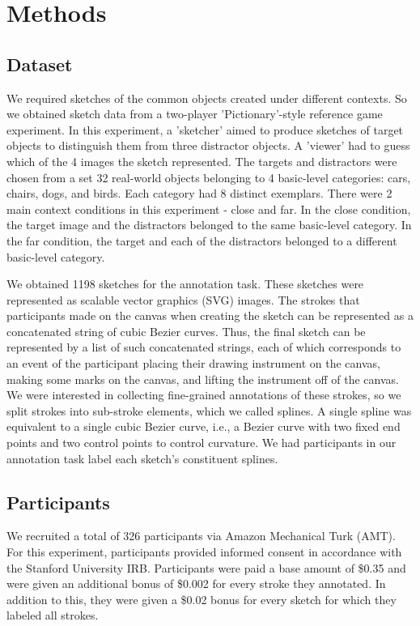 \documentclass[10pt,letterpaper]{article}
\begin{document}
\section{Methods}

\subsection{Dataset}

We required sketches of the common objects created under different contexts. 
So we obtained sketch data from a two-player 'Pictionary'-style reference game experiment. 
In this experiment, a 'sketcher' aimed to produce sketches of target objects to distinguish them from three distractor objects. 
A 'viewer' had to guess which of the 4 images the sketch represented. 
The targets and distractors were chosen from a set 32 real-world objects belonging to 4 basic-level categories: cars, chairs, dogs, and birds. 
Each category had 8 distinct exemplars. 
There were 2 main context conditions in this experiment - close and far. 
In the close condition, the target image and the distractors belonged to the same basic-level category. 
In the far condition, the target and each of the distractors belonged to a different basic-level category.

We obtained 1198 sketches for the annotation task. 
These sketches were represented as scalable vector graphics (SVG) images. 
The strokes that participants made on the canvas when creating the sketch can be represented as a concatenated string of cubic Bezier curves.  
Thus, the final sketch can be represented by a list of such concatenated strings, each of which corresponds to an event of the participant placing their drawing instrument on the canvas, making some marks on the canvas, and lifting the instrument off of the canvas. 
We were interested in collecting fine-grained annotations of these strokes, so we split strokes into sub-stroke elements, which we called splines. 
A single spline was equivalent to a single cubic Bezier curve, i.e., a Bezier curve with two fixed end points and two control points to control curvature. 
We had participants in our annotation task label each sketch's constituent splines.


\subsection{Participants}

We recruited a total of 326 participants via Amazon Mechanical Turk (AMT).  
For this experiment, participants provided informed consent in accordance with the Stanford University IRB. 
Participants were paid a base amount of \$0.35 and were given an additional bonus of \$0.002 for every stroke they annotated. 
In addition to this, they were given a \$0.02 bonus for every sketch for which they labeled all strokes. 
\end{document}

